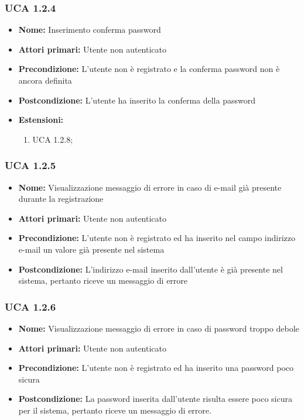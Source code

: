 \documentclass[a4paper, oneside, dvipsnames, table]{article} %
\begin{document}
\subsubsection{UCA 1.2.4}%
\begin{itemize}
\item \textbf{Nome:} Inserimento conferma password
\item \textbf{Attori primari:} Utente non autenticato
\item \textbf{Precondizione:} L’utente non è registrato  e la conferma password non è ancora definita
\item \textbf{Postcondizione:} L’utente ha inserito la conferma della password
\item \textbf{Estensioni:}
	\begin{enumerate}
		\item UCA 1.2.8;
	\end{enumerate}
\end{itemize}

\subsubsection{UCA 1.2.5}%
\begin{itemize}
\item \textbf{Nome:} Visualizzazione messaggio di errore in caso di e-mail già presente durante la registrazione
\item \textbf{Attori primari:} Utente non autenticato
\item \textbf{Precondizione:} L’utente non è registrato ed ha inserito nel campo indirizzo e-mail un valore già presente nel sistema
\item \textbf{Postcondizione:} L'indirizzo e-mail inserito dall'utente è già presente nel sistema, pertanto riceve un messaggio di errore 
\end{itemize}

\subsubsection{UCA 1.2.6}%
\begin{itemize}
\item \textbf{Nome:} Visualizzazione messaggio di errore in caso di password troppo debole 
\item \textbf{Attori primari:} Utente non autenticato
\item \textbf{Precondizione:} L’utente non è registrato ed ha inserito una password poco sicura
\item \textbf{Postcondizione:} La password inserita dall’utente risulta essere poco sicura per il sistema, pertanto riceve un messaggio di errore.
\end{itemize}
\end{document}
